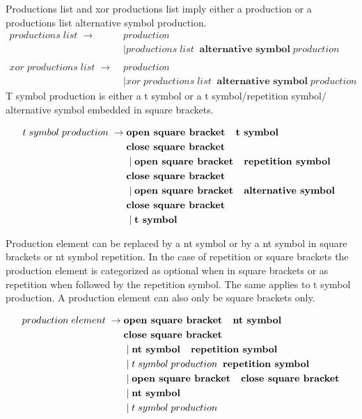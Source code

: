 Productions list and xor productions list imply either a production or a productions list alternative symbol production.
\begin{align*}
        productions\;list\; \rightarrow\; &production \\
               &\mid productions\;list\;\;\textbf{alternative symbol} \;production \\ \\                  
        xor\;productions\;list\; \rightarrow\; &production \\
               &\mid xor\;productions\;list\;\;\textbf{alternative symbol}\;production
\end{align*}
T symbol production is either a t symbol or a t symbol/repetition symbol/ alternative symbol embedded in square brackets.

\begin{align*}
	t\;symbol\;production\; \rightarrow\; & \textbf{open square bracket \; t symbol} \\ &\textbf{close square bracket}\\
               &\mid \textbf{open square bracket \; repetition symbol} \\ &\textbf{close square bracket}\\
               &\mid \textbf{open square bracket \; alternative symbol } \\ &\textbf{close square bracket}\\
               &\mid \textbf{t symbol} 
\end{align*}

Production element can be replaced by a nt symbol or by a nt symbol in square brackets or nt symbol repetition. In the case of repetition or square brackets the production element is categorized as optional when in square brackets or as repetition when followed by the repetition symbol. The same applies to t symbol production. A production element can also only be square brackets only.

 

\begin{align*}
	production\;element\; \rightarrow\; & \textbf{open square bracket \; nt symbol} \\ 
			   &\textbf{close square bracket}\\
               &\mid \textbf{nt symbol \; repetition symbol} \\
               &\mid t\;symbol\;production\;\; \textbf{repetition symbol} \\
               &\mid \textbf{open square bracket \; close square bracket} \\
               &\mid \textbf{nt symbol} \\
               &\mid t\; symbol\; production 
\end{align*}

